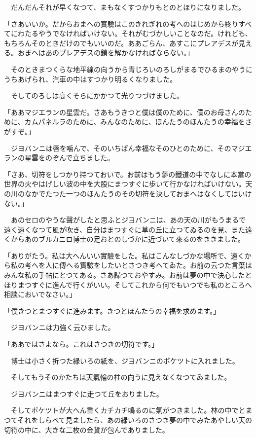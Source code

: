 \documentclass[tate,paper=b6j,jafontsize=9pt]{jlreq}
\begin{document}
　だんだんそれが早くなつて、まもなくすつかりもとのとほりになりました。

「さあいいか。だからおまへの實驗はこのきれぎれの考へのはじめから終りすべてにわたるやうでなければいけない。それがむづかしいことなのだ。けれども、もちろんそのときだけのでもいいのだ。ああごらん、あすこにプレアデスが見える。おまへはあのプレアデスの鎖を解かなければならない。」

　そのときまつくらな地平線の向うから青じろいのろしがまるでひるまのやうにうちあげられ、汽車の中はすつかり明るくなりました。

　そしてのろしは高くそらにかかつて光りつづけました。

「ああマジエランの星雲だ。さあもうきつと僕は僕のために、僕のお母さんのために、カムパネルラのために、みんなのために、ほんたうのほんたうの幸福をさがすぞ。」

　ジヨバンニは唇を噛んで、そのいちばん幸福なそのひとのために、そのマジエランの星雲をのぞんで立ちました。

「さあ、切符をしつかり持つておいで。お前はもう夢の鐵道の中でなしに本當の世界の火やはげしい波の中を大股にまつすぐに歩いて行かなければいけない。天の川のなかでたつた一つのほんたうのその切符を決しておまへはなくしてはいけない。」

　あのセロのやうな聲がしたと思ふとジヨバンニは、あの天の川がもうまるで遠く遠くなつて風が吹き、自分はまつすぐに草の丘に立つてゐるのを見、また遠くからあのブルカニロ博士の足おとのしづかに近づいて來るのをききました。

「ありがたう。私は大へんいい實驗をした。私はこんなしづかな場所で、遠くから私の考へを人に傳へる實驗をしたいとさつき考へてゐた。お前の云つた言葉はみんな私の手帖にとつてある。さあ歸つておやすみ。お前は夢の中で決心したとほりまつすぐに進んで行くがいい。そしてこれから何でもいつでも私のところへ相談においでなさい。」

「僕きつとまつすぐに進みます。きつとほんたうの幸福を求めます。」

　ジヨバンニは力強く云ひました。

「ああではさよなら。これはさつきの切符です。」

　博士は小さく折つた緑いろの紙を、ジヨバンニのポケツトに入れました。

　そしてもうそのかたちは天氣輪の柱の向うに見えなくなつてゐました。

　ジヨバンニはまつすぐに走つて丘をおりました。

　そしてポケツトが大へん重くカチカチ鳴るのに氣がつきました。林の中でとまつてそれをしらべて見ましたら、あの緑いろのさつき夢の中でみたあやしい天の切符の中に、大きな二枚の金貨が包んでありました。
\end{document}
